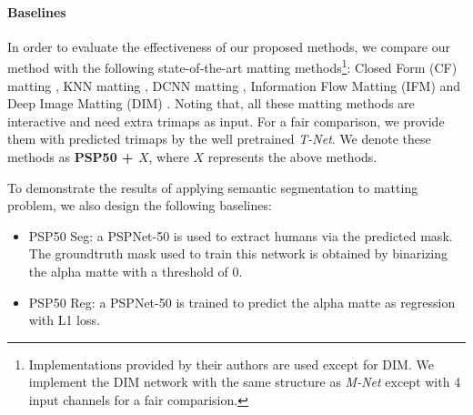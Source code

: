 \begin{comment}
\begin{equation}
\label{metric_error}
Error(A^{p}, A^{gt}) = \frac{1}{K} \sum_i||M(A_{i}^{p} ) - M(A_{i}^{gt} )||
\end{equation}
where $A^{p}$ and $A^{gt}$ are the predicted alpha matte and ground truth alpha matte respectively. K is the number of pixels in alpha matte. $M(A_i)$ and ||.|| are functions and distance types used to calculate the corresponding matte errors.
\end{comment}

\paragraph{\textbf{Baselines}}
In order to evaluate the effectiveness of our proposed methods, we compare our method with the following state-of-the-art matting methods\footnote{Implementations provided by their authors are used except for DIM. We implement the DIM network with the same structure as \emph{M-Net} except with 4 input channels for a fair comparision.}:
Closed Form (CF) matting \cite{levin2008closed} , KNN matting \cite{chen2013knn}, DCNN matting \cite{cho2016natural} , Information Flow Matting (IFM) \cite{aksoy2017designing} and Deep Image Matting (DIM) \cite{xu2017deep}.
Noting that, all these matting methods are interactive and need extra trimaps as input.
For a fair comparison, we provide them with predicted trimaps by the well pretrained \emph{T-Net}.
We denote these methods as \textbf{PSP50 + $X$}, where $X$ represents the above methods.

To demonstrate the results of applying semantic segmentation to matting problem, we also design the following baselines:
\begin{itemize}
  \item PSP50 Seg: a PSPNet-50 is used to extract humans via the predicted mask. The groundtruth mask used to train this network is obtained by binarizing the alpha matte with a threshold of 0.
  \item PSP50 Reg: a PSPNet-50 is trained to predict the alpha matte as regression with L1 loss.
\end{itemize}



